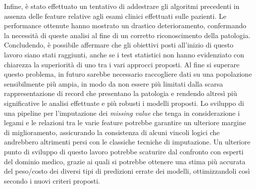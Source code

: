 Infine, è stato effettuato un tentativo di addestrare gli algoritmi precedenti in assenza delle feature relative agli esami clinici effettuati sulle pazienti. Le performance ottenute hanno mostrato un drastico deterioramento, confermando la necessità di queste analisi al fine di un corretto riconoscimento della patologia.
Concludendo, è possibile affermare che gli obiettivi posti all'inizio di questo lavoro siano stati raggiunti, anche se i test statistici non hanno evidenziato con chiarezza la superiorità di uno tra i vari approcci proposti.
Al fine si superare questo problema, in futuro sarebbe necessario raccogliere dati su una popolazione sensibilmente più ampia, in modo da non essere più limitati dalla scarsa rappresentazione di record che presentano la patologia e rendendo altresì più significative le analisi effettuate e più robusti i modelli proposti.
Lo sviluppo di una pipeline per l'imputazione dei \textit{missing value} che tenga in considerazione i legami e le relazioni tra le varie feature potrebbe garantire un ulteriore margine di miglioramento, assicurando la consistenza di alcuni vincoli logici che andrebbero altrimenti persi con le classiche tecniche di imputazione.
Un ulteriore punto di sviluppo di questo lavoro potrebbe scaturire dal confronto con esperti del dominio medico, grazie ai quali si potrebbe ottenere una stima più accurata del peso/costo dei diversi tipi di predizioni errate dei modelli, ottimizzandoli così secondo i nuovi criteri proposti.